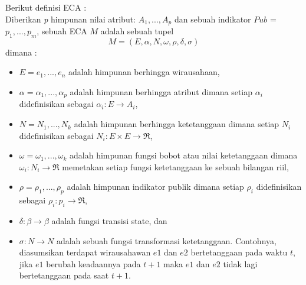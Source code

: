 Berikut definisi ECA :\\
Diberikan \textit{p} himpunan nilai atribut: $A_{1}, ..., A_{p}$ dan sebuah indikator $Pub$ = ${p_{1}, ..., p_{m}}$, sebuah ECA $M$ adalah sebuah tupel
\begin{displaymath}
	M = (E, \alpha, N, \omega, \rho, \delta, \sigma)
\end{displaymath}
dimana :
\begin{itemize}
	\item $E = {e_{1}, ..., e_{n}}$ adalah himpunan berhingga wirausahaan,
	\item $\alpha = {\alpha_{1}, ..., \alpha_{p}}$ adalah himpunan berhingga atribut dimana setiap $\alpha_{i}$ didefinisikan sebagai $\alpha_{i} : E \rightarrow A_{i}$,
	\item $N = {N_{1}, ..., N_{k}}$ adalah himpunan berhingga ketetanggaan dimana setiap $N_{i}$ didefinisikan sebagai $N_{i}:E \times E \rightarrow \Re$,
	\item $\omega = {\omega_{1}, ..., \omega_{k}}$ adalah himpunan fungsi bobot atau nilai ketetanggaan dimana $\omega_{i} : N_{i} \rightarrow \Re$ memetakan setiap fungsi ketetanggaan ke sebuah bilangan riil,
	\item $\rho = {\rho_{1}, ..., \rho_{p}}$ adalah himpunan indikator publik dimana setiap $\rho_{i}$ didefinisikan sebagai $\rho_{i} : p_{i} \rightarrow \Re$,
	\item $\delta : \beta \rightarrow \beta$ adalah fungsi transisi state, dan
	\item $\sigma : N \rightarrow N$ adalah sebuah fungsi transformasi ketetanggaan. Contohnya, diasumsikan terdapat wirausahawan $e1$ dan $e2$ bertetanggaan pada waktu $t$, jika $e1$ berubah keadaannya pada $t+1$ maka $e1$ dan $e2$ tidak lagi bertetanggaan pada saat $t+1$.

\end{itemize}

